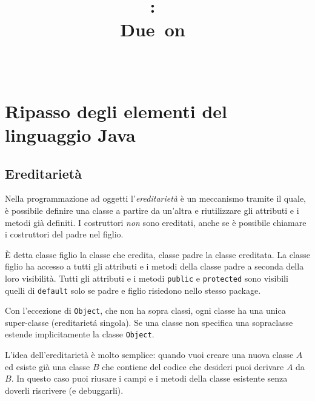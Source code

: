 \documentclass{article}
\title{
\vspace{2in}
\textmd{\textbf{\hmwkClass:\ \hmwkTitle}}\\
\normalsize\vspace{0.1in}\small{Due\ on\ \hmwkDueDate}\\
\vspace{0.1in}\large{\textit{\hmwkClassInstructor\ \hmwkClassTime}}
\vspace{3in}
}
\author{\textbf{\hmwkAuthorName}}
\date{} %
\begin{document}
\maketitle



\newpage
\tableofcontents
\newpage

\theoremstyle{definition} 

\newtheorem{mydef}{Definition}
\newtheorem{lemma}{Lemma}

\newtheorem{theorem}{Theorem}[section]

\section{Ripasso degli elementi del linguaggio Java}
\subsection{Ereditarietà}

Nella programmazione ad oggetti l'\emph{ereditarietà} è un meccanismo tramite il quale,
è possibile definire una classe a partire da un'altra e riutilizzare gli attributi e i metodi
già definiti. I costruttori \emph{non} sono ereditati, anche se \`e possibile chiamare i costruttori del padre nel figlio.

È detta classe figlio la classe che eredita, classe padre la classe ereditata.
La classe figlio ha accesso a tutti gli attributi e i metodi della classe padre a seconda della loro visibilit\`a. Tutti gli attributi e i metodi \texttt{public} e \texttt{protected} sono visibili quelli di \texttt{default} solo se padre e figlio risiedono nello stesso package.

Con l'eccezione di  \texttt{Object}, che non ha sopra classi, ogni classe ha una unica super-classe (ereditariet\'a singola). Se una classe non specifica una sopraclasse estende implicitamente la classe \texttt{Object}.

L'idea dell'ereditariet\`a \`e molto semplice: quando vuoi creare una nuova classe $A$ ed esiste gi\`a una classe $B$ che contiene del codice che desideri puoi derivare $A$ da $B$. In questo caso puoi riusare i campi e i metodi della classe esistente senza doverli riscrivere (e debuggarli).
\end{document}
